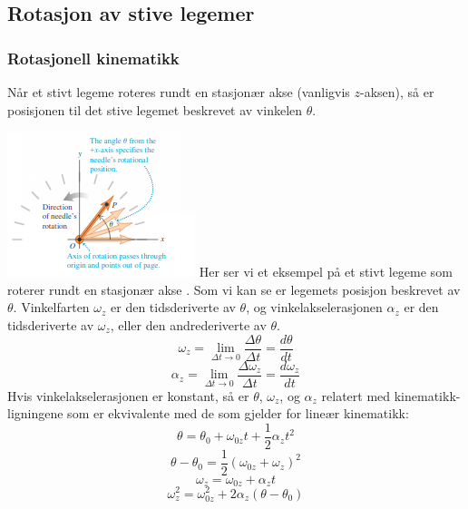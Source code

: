 \graphicspath{ {./bilder/} }

\subsection{Rotasjon av stive legemer}

\subsubsection{Rotasjonell kinematikk}
Når et stivt legeme roteres rundt en stasjonær akse (vanligvis $z$-aksen), så er posisjonen til det stive legemet beskrevet av vinkelen $\theta.$\newline\newline

\includegraphics{rapport/teori/bilder/theta.png}\newline\newline
Her ser vi et eksempel på et stivt legeme som roterer rundt en stasjonær akse \cite{FYSIKK:1}. Som vi kan se er legemets posisjon beskrevet av $\theta.$\newline\newline
Vinkelfarten $\omega_z$ er den tidsderiverte av $\theta$, og vinkelakselerasjonen $\alpha_z$ er den tidsderiverte av $\omega_z$, eller den andrederiverte av $\theta.$
\begin{equation}
    \omega_z=\lim_{\Delta t\rightarrow0}{\frac{\Delta\theta}{\Delta t}}=\frac{d\theta}{dt}
\end{equation}
\begin{equation}
    \alpha_z=\lim_{\Delta t\rightarrow0}{\frac{\Delta\omega_z}{\Delta t}}=\frac{d\omega_z}{dt}
\end{equation}
Hvis vinkelakselerasjonen er konstant, så er $\theta$, $\omega_z$, og $\alpha_z$ relatert med kinematikk-ligningene som er ekvivalente med de som gjelder for lineær kinematikk:
\begin{equation}
    \theta=\theta_0+\omega_{0z}t+\frac{1}{2}\alpha_zt^2
\end{equation}
\begin{equation}
    \theta-\theta_0=\frac{1}{2}\left(\omega_{0z}+\omega_z\right)^2
\end{equation}
\begin{equation}
    \omega_z=\omega_{0z}+\alpha_zt
\end{equation}
\begin{equation}
    \omega_z^2=\omega_{0z}^2+2\alpha_z(\theta-\theta_0)
\end{equation}

